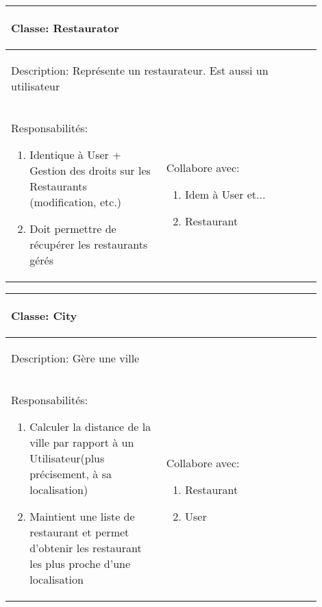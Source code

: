 \documentclass[10pt,a4paper]{article}
\begin{document}
\begin{tabular}{|p{0.45\linewidth}|p{0.45\linewidth}|}
  \hline
  \multicolumn{2}{|l|}{\begin{large}
  	Classe: Restaurator
  \end{large}}\\
  \hline
  \multicolumn{2}{|l|}{\begin{normalsize}
  	Description: Représente un restaurateur. Est aussi un utilisateur
  \end{normalsize}}\\[0.05\linewidth]
  \hline
  \begin{normalsize}
  	Responsabilités:
  	\begin{enumerate}
  		\item Identique à User + Gestion des droits sur les Restaurants (modification, etc.)
  		\item Doit permettre de récupérer les restaurants gérés
  	\end{enumerate}
  \end{normalsize} & 
  \begin{normalsize}{
  	Collabore avec:
  	\begin{enumerate}
  		\item Idem à User et...
  		\item Restaurant
  	\end{enumerate}
  }\end{normalsize}\\[0.6\linewidth]
  \hline
\end{tabular}

\begin{tabular}{|p{0.45\linewidth}|p{0.45\linewidth}|}
  \hline
  \multicolumn{2}{|l|}{\begin{large}
  	Classe: City
  \end{large}}\\
  \hline
  \multicolumn{2}{|l|}{\begin{normalsize}
  	Description: Gère une ville
  \end{normalsize}}\\[0.05\linewidth]
  \hline
  \begin{normalsize}
  	Responsabilités:
  	\begin{enumerate}
  		\item Calculer la distance de la ville par rapport à un Utilisateur(plus précisement, à sa localisation)
  		\item Maintient une liste de restaurant et permet d'obtenir les restaurant les plus proche d'une localisation
  	\end{enumerate}
  \end{normalsize} & 
  \begin{normalsize}{
  	Collabore avec:
  	\begin{enumerate}
  		\item Restaurant
  		\item User
  	\end{enumerate}
  }\end{normalsize}\\[0.6\linewidth]
  \hline
\end{tabular}
\end{document}
